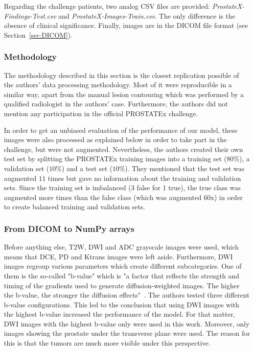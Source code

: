 \noindent Regarding the challenge patients, two analog CSV files are provided: \textit{ProstateX-Findings-Test.csv} and \textit{ProstateX-Images-Train.csv}. The only difference is the absence of clinical significance. Finally, images are in the DICOM file format (see \mbox{Section \ref{sec:DICOM}}). 


\subsubsection{Methodology}
\setlength{\marginparwidth}{3cm}\leavevmode {}The methodology described in this section is the closest replication possible of the authors' data processing methodology. Most of it were reproducible in a similar way, apart from the manual lesion contouring which was performed by a qualified radiologist in the authors' case. Furthermore, the authors did not mention any participation in the official PROSTATEx challenge.

In order to get an unbiased evaluation of the performance of our model, these images were also processed as explained below in order to take part in the challenge, but were not augmented. Nevertheless, the authors created their own test set by splitting the PROSTATEx training images into a training set ($80\%$), a validation set ($10\%$) and a test set ($10\%$). They mentioned that the test set was augmented $11$ times but gave no information about the training and validation sets. Since the training set is imbalanced (3 false for 1 true), the true class was augmented more times than the false class (which was augmented $60$x) in order to create balanced training and validation sets. 


\subsubsection{From DICOM to NumPy arrays}
\label{sec:DICOMtoNumPy}
\setlength{\marginparwidth}{3cm}\leavevmode {}Before anything else, T2W, DWI and ADC grayscale images were used, which means that DCE, PD and Ktrans images were left aside. Furthermore, DWI images regroup various parameters which create different subcategories. One of them is the so-called "b-value" which is "a factor that reflects the strength and timing of the gradients used to generate diffusion-weighted images. The higher the b-value, the stronger the diffusion effects"~\cite{49}. The authors tested three different b-value configurations. This led to the conclusion that using DWI images with the highest b-value increased the performance of the model. For that matter, DWI images with the highest b-value only were used in this work. Moreover, only images showing the prostate under the transverse plane were used. The reason for this is that the tumors are much more visible under this perspective. 

